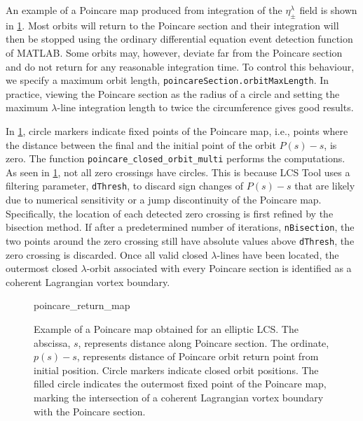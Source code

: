 \documentclass{article}
\newlength\figurewidth
\begin{document}
\begin{sloppypar}
An example of a Poincare map produced from integration of the $\eta_\pm^\lambda$ field is shown in \cref{f:Poincare return map}.
Most orbits will return to the Poincare section and their integration will then be stopped using the ordinary differential equation event detection function of MATLAB.
Some orbits may, however, deviate far from the Poincare section and do not return for any reasonable integration time.
To control this behaviour, we specify a maximum orbit length, \lstinline!poincareSection.orbitMaxLength!.
In practice, viewing the Poincare section as the radius of a circle and setting the maximum $\lambda$-line integration length to twice the circumference gives good results.
\end{sloppypar}

In \cref{f:Poincare return map}, circle markers indicate fixed points of the Poincare map, i.e., points where the distance between the final and the initial point of the orbit $P(s) - s$, is zero. The function \lstinline!poincare_closed_orbit_multi! performs the computations. As seen in \cref{f:Poincare return map}, not all zero crossings have circles. This is because LCS Tool uses a filtering parameter, \lstinline!dThresh!, to discard sign changes of $P(s) - s$ that are likely due to numerical sensitivity or a jump discontinuity of the Poincare map. Specifically, the location of each detected zero crossing is first refined by the bisection method. If after a predetermined number of iterations, \lstinline!nBisection!, the two points around the zero crossing still have absolute values above \lstinline!dThresh!, the zero crossing is discarded.  Once all valid closed $\lambda$-lines have been located, the outermost closed $\lambda$-orbit associated with every Poincare section is identified as a coherent Lagrangian vortex boundary.

\begin{figure}
\begin{center}
\setlength{}
{poincare_return_map}
\end{center}
\caption{Example of a Poincare map obtained for an elliptic LCS.
The abscissa, $s$, represents distance along Poincare section.
The ordinate, $p(s) - s$, represents distance of Poincare orbit return point from initial position.
Circle markers indicate closed orbit positions.
The filled circle indicates the outermost fixed point of the Poincare map, marking the intersection of a coherent Lagrangian vortex boundary with the Poincare section.}
\label{f:Poincare return map}
\end{figure}
\end{document}
